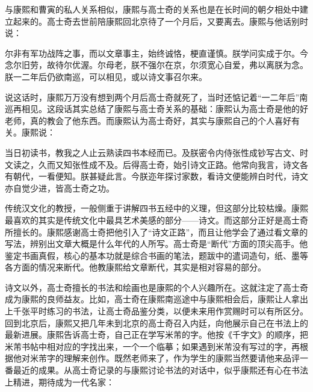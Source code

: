 
与康熙和曹寅的私人关系相似，康熙与高士奇的关系也是在长时间的朝夕相处中建立起来的。高士奇去世前陪康熙回北京待了一个月后，又要离去。康熙与他话别时说：



\begin{bookquote}尔非有军功战阵之事，而以文章事主，始终诚恪，梗直谨慎。朕学问实成于尔。今念尔旧劳，故待尔优渥。尔母老，朕不强尔在京，尔须宽心自爱，弗以离朕为念。朕一二年后仍欲南巡，可以相见，或以诗文事召尔来。\end{bookquote}


说这话时，康熙万万没有想到两个月后高士奇就死了，当时还惦记着“一二年后”南巡再相见。这段话其实总结了康熙与高士奇关系的基础：康熙认为高士奇是他的好老师，真的教会了他东西。而康熙认为高士奇好，其实与康熙自己的个人喜好有关。康熙说：



\begin{bookquote}当日初读书，教我之人止云熟读四书本经而已。及朕密令内侍张性成钞写古文、时文读之，久而又知张性成不及。后得高士奇，始引诗文正路。他常向我言，诗文各有朝代，一看便知。朕甚疑此言。今朕迩年探讨家数，看诗文便能辨白时代，诗文亦自觉少进，皆高士奇之功。\end{bookquote}


传统汉文化的教授，一般侧重于讲解四书五经中的义理，但这部分比较枯燥。康熙最喜欢的其实是传统文化中最具艺术美感的部分——诗文。而这部分正好是高士奇所擅长的。康熙感谢高士奇把他引入了“诗文正路”，而且让他学会了通过看文章的写法，辨别出文章大概是什么年代的人所写。高士奇是“断代”方面的顶尖高手。他鉴定书画真假，核心的基本功就是综合书画的笔法，题跋中的遣词造句，纸、墨等各方面的情况来断代。他教康熙给文章断代，其实是相对容易的部分。



诗文以外，高士奇擅长的书法和绘画也是康熙的个人兴趣所在。这就注定了高士奇成为康熙的良师益友。比如，高士奇在康熙南巡途中与康熙相会后，康熙让人拿出上千张平时练习的书法，让高士奇品鉴分类，以便未来用作赏赐时可以有所区分。回到北京后，康熙又把几年未到北京的高士奇召入内廷，向他展示自己在书法上的最新进展。康熙告诉高士奇，自己正在学写米芾的字。他按《千字文》的顺序，把米芾书帖中相对应的字找出来，一个一个临摹；如果遇到米芾没有写过的字，再根据他对米芾字的理解来创作。既然老师来了，作为学生的康熙当然要请他来品评一番最近的成果。从高士奇记录的与康熙讨论书法的对话中，似乎康熙还有心在书法上精进，期待成为一代名家：


